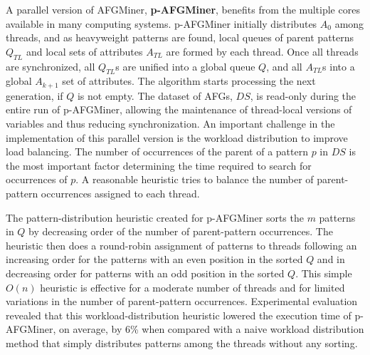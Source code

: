 A parallel version of AFGMiner, {\bf p-AFGMiner}, benefits from the multiple cores available in many computing systems. p-AFGMiner initially distributes $A_{0}$ among threads, and as heavyweight patterns are found, local queues of parent patterns $Q_{TL}$ and local sets of attributes $A_{TL}$ are formed by each thread. Once all threads are synchronized, all $Q_{TL}$s are unified into a global queue $Q$, and all $A_{TL}$s into a global $A_{k+1}$ set of attributes. The algorithm starts processing the next generation, if $Q$ is not empty. The dataset of AFGs, $DS$, is read-only during the entire run of p-AFGMiner, allowing the maintenance of thread-local versions of variables and thus reducing synchronization. An important challenge in the implementation of this parallel version is the workload distribution to improve load balancing. The number of occurrences of the parent of a pattern $p$ in $DS$ is the most important factor determining the time required to search for occurrences of $p$. A reasonable heuristic tries to balance the number of parent-pattern occurrences assigned to each thread. 

The pattern-distribution heuristic created for p-AFGMiner sorts the $m$ patterns in $Q$ by decreasing order of the number of parent-pattern occurrences. The heuristic then does a round-robin assignment of patterns to threads following an increasing order for the patterns with an even position in the sorted $Q$ and in decreasing order for patterns with an odd position in the sorted $Q$. This simple $O(n)$ heuristic is effective for a moderate number of threads and for limited variations in the number of parent-pattern occurrences. Experimental evaluation revealed that this workload-distribution heuristic lowered the execution time of p-AFGMiner, on average, by 6\% when compared with a naive workload distribution method that simply distributes patterns among the threads without any sorting.


 


 
